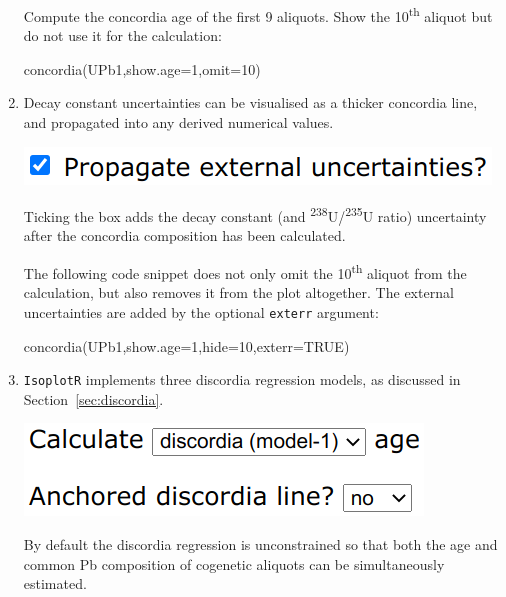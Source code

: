 \begin{refsection}
\begin{enumerate}
Compute the concordia age of the first 9 aliquots. Show the
10\textsuperscript{th} aliquot but do not use it for the calculation:

\begin{console}
concordia(UPb1,show.age=1,omit=10)
\end{console}

\item Decay constant uncertainties can be visualised as a thicker
  concordia line, and propagated into any derived numerical values.

\noindent\begin{minipage}[t]{.35\linewidth}
\strut\vspace*{-\baselineskip}\newline
\includegraphics[width=\linewidth]{../figures/concordiaexterr.png}
\end{minipage}
\begin{minipage}[t]{.65\linewidth}
  Ticking the box adds the decay constant (and
  \textsuperscript{238}U/\textsuperscript{235}U ratio) uncertainty
  after the concordia composition has been calculated.
\end{minipage}

The following code snippet does not only omit the
10\textsuperscript{th} aliquot from the calculation, but also removes
it from the plot altogether. The external uncertainties are added by
the optional \texttt{exterr} argument:

\begin{console}
concordia(UPb1,show.age=1,hide=10,exterr=TRUE)
\end{console}

\item \texttt{IsoplotR} implements three discordia regression models,
  as discussed in Section~\ref{sec:discordia}.

  \noindent\begin{minipage}[t]{.3\linewidth}
  \strut\vspace*{-\baselineskip}\newline
  \includegraphics[width=\linewidth]{../figures/discordia.png}
  \end{minipage}
  \begin{minipage}[t]{.7\linewidth}
    By default the discordia regression is unconstrained so that both
    the age and common Pb composition of cogenetic aliquots can be
    simultaneously estimated.\\
  \end{minipage}


\end{enumerate}
\end{refsection}

